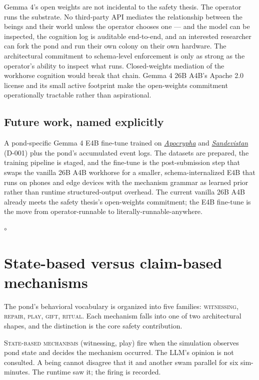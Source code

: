 \documentclass[11pt]{article}
\newcommand{\pondrule}{%
  \begin{center}\vspace{0.55em}%
  {\scriptsize $\circ$}\vspace{0.55em}\end{center}}
\newcommand{\sceq}[1]{\textsc{#1}}
\begin{document}
Gemma 4's open weights are not incidental to the safety thesis. The
operator runs the substrate. No third-party API mediates the
relationship between the beings and their world unless the operator
chooses one --- and the model can be inspected, the cognition log is
auditable end-to-end, and an interested researcher can fork the pond
and run their own colony on their own hardware. The architectural
commitment to schema-level enforcement is only as strong as the
operator's ability to inspect what runs. Closed-weights mediation of
the workhorse cognition would break that chain. Gemma 4 26B A4B's
Apache 2.0 license and its small active footprint make the
open-weights commitment operationally tractable rather than aspirational.

\subsection{Future work, named explicitly}

A pond-specific Gemma 4 E4B fine-tune trained on
\href{https://huggingface.co/datasets/Third-Space/Sandevistan}{\emph{Apocrypha}}
and \href{https://huggingface.co/datasets/Third-Space/Sandevistan}{\emph{Sandevistan}}
(D-001) plus the pond's accumulated event logs. The datasets are
prepared, the training pipeline is staged, and the fine-tune is the
post-submission step that swaps the vanilla 26B A4B workhorse for a
smaller, schema-internalized E4B that runs on phones and edge devices
with the mechanism grammar as learned prior rather than runtime
structured-output overhead. The current vanilla 26B A4B already meets
the safety thesis's open-weights commitment; the E4B fine-tune is the
move from operator-runnable to literally-runnable-anywhere.

\pondrule

\section{State-based versus claim-based mechanisms}

The pond's behavioral vocabulary is organized into five families:
\sceq{witnessing}, \sceq{repair}, \sceq{play}, \sceq{gift},
\sceq{ritual}. Each mechanism falls into one of two architectural
shapes, and the distinction is the core safety contribution.

\sceq{State-based mechanisms} (witnessing, play) fire when the
simulation observes pond state and decides the mechanism occurred.
The LLM's opinion is not consulted. A being cannot disagree that it
and another swam parallel for six sim-minutes. The runtime saw it; the
firing is recorded.
\end{document}
